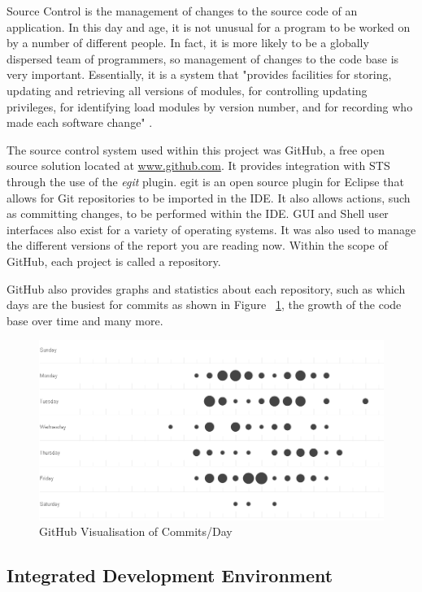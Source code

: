 Source Control is the management of changes to the source code of an application. In this day and age, it is not unusual for a program to be worked on by a number of different people. In fact, it is more likely to be a globally dispersed team of programmers, so management of changes to the code base is very important. Essentially, it is a system that "provides facilities for storing, updating and retrieving all versions of modules, for controlling updating privileges, for identifying load modules by version number, and for recording who made each software change" \parencite{rochkind1975source}.

The source control system used within this project was GitHub, a free open source solution located at \href{http://www.github.com}{www.github.com}. It provides integration with STS through the use of the \textit{egit} plugin. egit is an open source plugin for Eclipse that allows for Git repositories to be imported in the IDE. It also allows actions, such as committing changes, to be performed within the IDE. GUI and Shell user interfaces also exist for a variety of operating systems. It was also used to manage the different versions of the report you are reading now. Within the scope of GitHub, each project is called a repository.

GitHub also provides graphs and statistics about each repository, such as which days are the busiest for commits as shown in Figure ~\ref{fig:git}, the growth of the code base over time and many more.

\begin{figure}[H]
\begin{center}
\includegraphics[width=15cm]{git.png}
\end{center}
\caption{GitHub Visualisation of Commits/Day}
\label{fig:git}
\end{figure}

\subsection{Integrated Development Environment}

